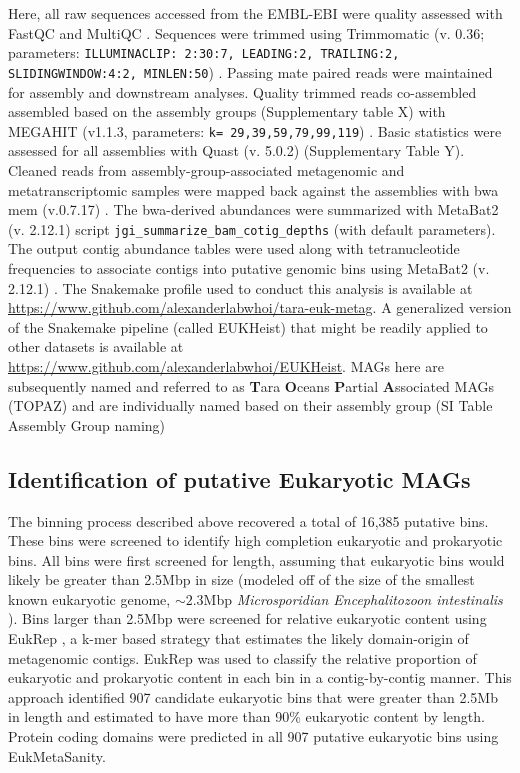\documentclass[12pt]{article}
\numberwithin{equation}{section}
\begin{document}
Here, all raw sequences accessed from the EMBL-EBI were quality assessed with FastQC and MultiQC \citep{Andrews2010FastQC}. Sequences were trimmed using Trimmomatic (v. 0.36; parameters: \texttt{ILLUMINACLIP: 2:30:7, LEADING:2, TRAILING:2, SLIDINGWINDOW:4:2, MINLEN:50}) \citep{Bolger2014Trimmomatic}. Passing mate paired reads were maintained for assembly and downstream analyses. Quality trimmed reads co-assembled assembled based on the assembly groups (Supplementary table X) with MEGAHIT (v1.1.3, parameters: \texttt{k= 29,39,59,79,99,119}) \citep{Li2015MEGAHIT}. Basic statistics were assessed for all assemblies with Quast (v. 5.0.2) \citep{Gurevich_2013} (Supplementary Table Y). Cleaned reads from assembly-group-associated metagenomic and metatranscriptomic samples were mapped back against the assemblies with bwa mem (v.0.7.17) \citep{Li2010Fast}. The bwa-derived abundances were summarized with MetaBat2 (v. 2.12.1) script \texttt{jgi\_summarize\_bam\_cotig\_depths} (with default parameters). The output contig abundance tables were used along with tetranucleotide frequencies to associate contigs into putative genomic bins using MetaBat2 (v. 2.12.1) \citep{Kang_2019}. The Snakemake profile used to conduct this analysis is available at \url{https://www.github.com/alexanderlabwhoi/tara-euk-metag}. A generalized version of the Snakemake pipeline (called EUKHeist) that might be readily applied to other datasets is available at \url{https://www.github.com/alexanderlabwhoi/EUKHeist}. MAGs here are subsequently named and referred to as \textbf{T}ara \textbf{O}ceans \textbf{P}artial \textbf{A}ssociated MAGs (TOPAZ) and are individually named based on their assembly group (SI Table Assembly Group naming)

\subsection*{Identification of putative Eukaryotic MAGs} The binning process described above recovered a total of 16,385 putative bins. These bins were screened to identify high completion eukaryotic and prokaryotic bins. All bins were first screened for length, assuming that eukaryotic bins would likely be greater than 2.5Mbp in size (modeled off of the size of the smallest known eukaryotic genome, $\sim 2.3$Mbp \textit{Microsporidian Encephalitozoon intestinalis} \citep{Corradi2010complete}). Bins larger than 2.5Mbp were screened for relative eukaryotic content using EukRep \citep{West2018Genome-reconstruction}, a k-mer based strategy that estimates the likely domain-origin of metagenomic contigs. EukRep was used to classify the relative proportion of eukaryotic and prokaryotic content in each bin in a contig-by-contig manner. This approach identified 907 candidate eukaryotic bins that were greater than 2.5Mb in length and estimated to have more than 90\% eukaryotic content by length. Protein coding domains were predicted in all 907 putative eukaryotic bins using EukMetaSanity. 
\end{document}
